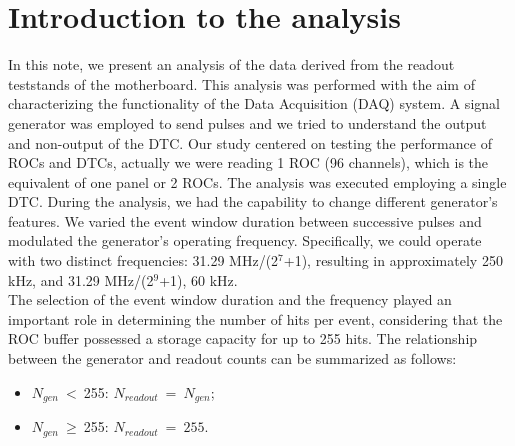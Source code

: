 \section {Introduction to the analysis}

In this note, we present an analysis of the data derived from the readout teststands of the motherboard.
This analysis was performed with the aim of characterizing the functionality of the Data Acquisition (DAQ) system.
A signal generator was employed to send pulses and we tried to understand the output and non-output of the DTC. 
Our study centered on testing the performance of ROCs and DTCs, actually we were reading 1 ROC (96 channels), 
which is the equivalent of one panel or 2 ROCs. The analysis was executed employing a single DTC.
During the analysis, we had the capability to change different generator's features. We varied the event
window duration between successive pulses and modulated the generator's operating frequency. 
Specifically, we could operate with two distinct frequencies: 31.29 MHz/(2$^7$+1), resulting in approximately 250 kHz,
and 31.29 MHz/(2$^9$+1), 60 kHz. \\
The selection of the event window duration and the frequency played an important role in determining the number of hits per event,
considering that the ROC buffer possessed a storage capacity for up to 255 hits. The relationship between the generator 
and readout counts can be summarized as follows:
\begin{itemize}
    \item $N_{gen} \ < \ $255: $N_{readout} \ = \ N_{gen}$;
    \item $N_{gen} \ \geq \ $255: $N_{readout} \ = \ 255$.
\end{itemize}
